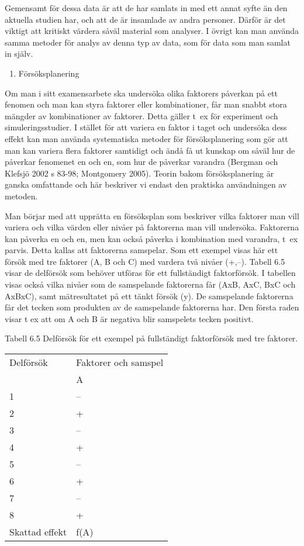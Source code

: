 Gemensamt för dessa data är att de har samlats in med ett annat syfte än
den aktuella studien har, och att de är insamlade av andra personer.
Därför är det viktigt att kritiskt värdera såväl material som analyser.
I övrigt kan man använda samma metoder för analys av denna typ av data,
som för data som man samlat in själv.

\begin{enumerate}
\def\labelenumi{\arabic{enumi}.}
\item
  Försöksplanering
\end{enumerate}

Om man i sitt examensarbete ska undersöka olika faktorers påverkan på
ett fenomen och man kan styra faktorer eller kombinationer, får man
snabbt stora mängder av kombinationer av faktorer. Detta gäller t~ex för
experiment och simuleringsstudier. I stället för att variera en faktor i
taget och undersöka dess effekt kan man använda systematiska metoder för
försöksplanering som gör att man kan variera flera faktorer samtidigt
och ändå få ut kunskap om såväl hur de påverkar fenomenet en och en, som
hur de påverkar varandra (Bergman och Klefsjö 2002 s 83-98; Montgomery
2005). Teorin bakom försöksplanering är ganska omfattande och här
beskriver vi endast den praktiska användningen av metoden.

Man börjar med att upprätta en försöksplan som beskriver vilka faktorer
man vill variera och vilka värden eller nivåer på faktorerna man vill
undersöka. Faktorerna kan påverka en och en, men kan också påverka i
kombination med varandra, t~ex parvis. Detta kallas att faktorerna
samspelar. Som ett exempel visas här ett försök med tre faktorer (A, B
och C) med vardera två nivåer (+,--). Tabell 6.5 visar de delförsök som
behöver utföras för ett fullständigt faktorförsök. I tabellen visas
också vilka nivåer som de samspelande faktorerna får (AxB, AxC, BxC och
AxBxC), samt mätresultatet på ett tänkt försök (y). De samspelande
faktorerna får det tecken som produkten av de samspelande faktorerna
har. Den första raden visar t ex att om A och B är negativa blir
samspelets tecken positivt.

Tabell 6.5 Delförsök för ett exempel på fullständigt faktorförsök med
tre faktorer.

\begin{longtable}[]{@{}ll@{}}
\toprule
Delförsök & Faktorer och samspel\tabularnewline
& A\tabularnewline
1 & --\tabularnewline
2 & +\tabularnewline
3 & --\tabularnewline
4 & +\tabularnewline
5 & --\tabularnewline
6 & +\tabularnewline
7 & --\tabularnewline
8 & +\tabularnewline
Skattad effekt & f(A)\tabularnewline
\bottomrule
\end{longtable}


